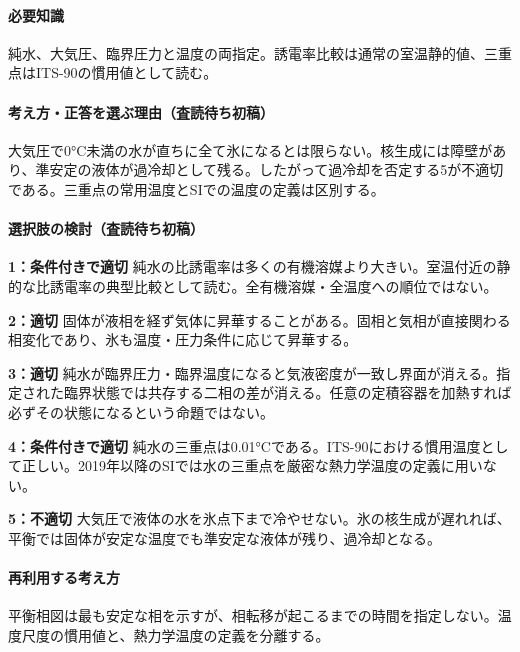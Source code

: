 \paragraph{必要知識} 純水、大気圧、臨界圧力と温度の両指定。誘電率比較は通常の室温静的値、三重点はITS-90の慣用値として読む。

\paragraph{考え方・正答を選ぶ理由（査読待ち初稿）} 大気圧で0°C未満の水が直ちに全て氷になるとは限らない。核生成には障壁があり、準安定の液体が過冷却として残る。したがって過冷却を否定する5が不適切である。三重点の常用温度とSIでの温度の定義は区別する。

\paragraph{選択肢の検討（査読待ち初稿）}\mbox{}\par

\noindent\textbf{1：条件付きで適切} 純水の比誘電率は多くの有機溶媒より大きい。室温付近の静的な比誘電率の典型比較として読む。全有機溶媒・全温度への順位ではない。\par

\noindent\textbf{2：適切} 固体が液相を経ず気体に昇華することがある。固相と気相が直接関わる相変化であり、氷も温度・圧力条件に応じて昇華する。\par

\noindent\textbf{3：適切} 純水が臨界圧力・臨界温度になると気液密度が一致し界面が消える。指定された臨界状態では共存する二相の差が消える。任意の定積容器を加熱すれば必ずその状態になるという命題ではない。\par

\noindent\textbf{4：条件付きで適切} 純水の三重点は0.01°Cである。ITS-90における慣用温度として正しい。2019年以降のSIでは水の三重点を厳密な熱力学温度の定義に用いない。\par

\noindent\textbf{5：不適切} 大気圧で液体の水を氷点下まで冷やせない。氷の核生成が遅れれば、平衡では固体が安定な温度でも準安定な液体が残り、過冷却となる。\par

\paragraph{再利用する考え方} 平衡相図は最も安定な相を示すが、相転移が起こるまでの時間を指定しない。温度尺度の慣用値と、熱力学温度の定義を分離する。

